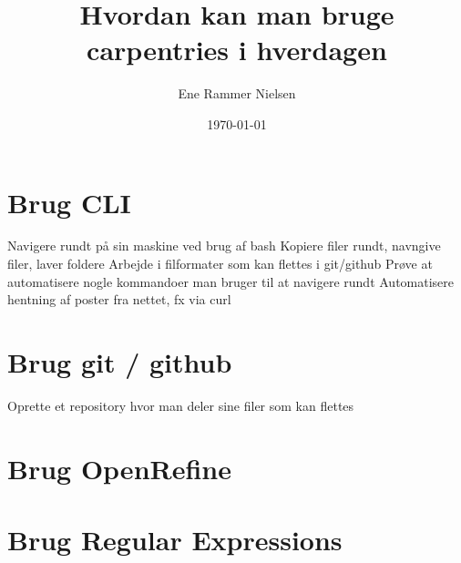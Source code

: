 \documentclass[11pt,a4paper]{report}
\title{Hvordan kan man bruge carpentries i hverdagen}
\author{Ene Rammer Nielsen}
\date{\today}
\begin{document}
\maketitle
\chapter*{Brug CLI}
Navigere rundt på sin maskine ved brug af bash
\newline
Kopiere filer rundt, navngive filer, laver foldere
\newline
Arbejde i filformater som kan flettes i git/github
\newline
Prøve at automatisere nogle kommandoer man bruger til at navigere rundt
\newline
Automatisere hentning af poster fra nettet, fx via curl

\chapter*{Brug git / github}
Oprette et repository hvor man deler sine filer som kan flettes

\chapter*{Brug OpenRefine}


\chapter*{Brug Regular Expressions}
\end{document}

